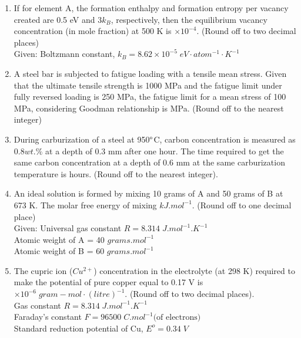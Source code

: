 \documentclass[journal]{IEEEtran}
\theoremstyle{remark}
\begin{document}
\begin{enumerate}[resume]
\item If for element A, the formation enthalpy and formation entropy per vacancy created are 0.5 eV and $3k_B$, respectively, then the equilibrium vacancy concentration (in mole fraction) at 500 K is \underline{\hspace{2cm}} $\times 10^{-4}$. (Round off to two decimal places) \hfill{}\\
Given: Boltzmann constant, $k_B = 8.62 \times 10^{-5}\; eV \cdot atom^{-1} \cdot K^{-1}$

\item A steel bar is subjected to fatigue loading with a tensile mean stress. Given that the ultimate tensile strength is 1000 MPa and the fatigue limit under fully reversed loading is 250 MPa, the fatigue limit for a mean stress of 100 MPa, considering Goodman relationship is \underline{\hspace{2cm}} MPa. (Round off to the nearest integer) \hfill{}

\item During carburization of a steel at 950$\degree$C, carbon concentration is measured as $0.8 wt.\%$ at a depth of 0.3 mm after one hour. The time required to get the same carbon concentration at a depth of 0.6 mm at the same carburization temperature is \underline{\hspace{2cm}} hours. (Round off to the nearest integer). \hfill{}

\item An ideal solution is formed by mixing 10 grams of A and 50 grams of B at 673 K. The molar free energy of mixing \underline{\hspace{2cm}} $kJ.mol^{-1}$. (Round off to one decimal place) \hfill{}\\
Given: Universal gas constant $R = 8.314\; J.mol^{-1}.K^{-1}$ \\
Atomic weight of A = 40 $grams.mol^{-1}$ \\
Atomic weight of B = 60 $grams.mol^{-1}$

\item The cupric ion ($Cu^{2+}$) concentration in the electrolyte (at 298 K) required to make the potential of pure copper equal to 0.17 V is \underline{\hspace{2cm}} $\times 10^{-6}\; gram-mol \cdot (litre)^{-1}$. (Round off to two decimal places). \hfill{}\\
Gas constant $R = 8.314\; J.mol^{-1}.K^{-1}$ \\
Faraday's constant $F = 96500\; C.mol^{-1}\text{(of electrons)}$ \\
Standard reduction potential of Cu, $E^o = 0.34\; V$


\end{enumerate}
\end{document}
